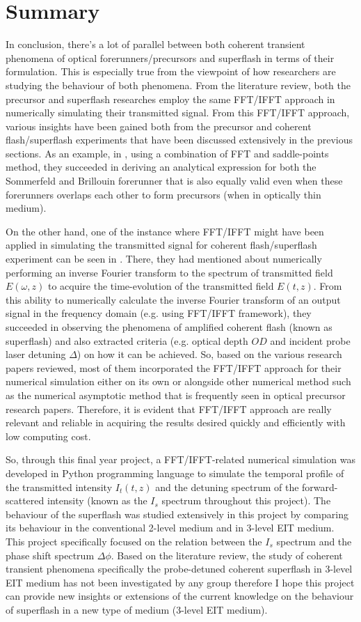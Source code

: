 \chapter{Summary}
In conclusion, there's a lot of parallel between both coherent transient phenomena of optical forerunners/precursors and superflash in terms of their formulation. This is especially true from the viewpoint of how researchers are studying the behaviour of both phenomena. From the literature review, both the precursor and superflash researches employ the same FFT/IFFT approach in numerically simulating their transmitted signal. From this FFT/IFFT approach, various insights have been gained both from the precursor and coherent flash/superflash experiments that have been discussed extensively in the previous sections. As an example, in \cite{Macke2013}, using a combination of FFT and saddle-points method, they succeeded in deriving an analytical expression for both the Sommerfeld and Brillouin forerunner that is also equally valid even when these forerunners overlaps each other to form precursors (when in optically thin medium).

On the other hand, one of the instance where FFT/IFFT might have been applied in simulating the transmitted signal for coherent flash/superflash experiment can be seen in \cite{Kwong2014}. There, they had mentioned about numerically performing an inverse Fourier transform to the spectrum of transmitted field $E(\omega, z)$ to acquire the time-evolution of the transmitted field $E(t, z)$. From this ability to numerically calculate the inverse Fourier transform of an output signal in the frequency domain (e.g. using FFT/IFFT framework), they succeeded in observing the phenomena of amplified coherent flash (known as superflash) and also extracted criteria (e.g. optical depth $OD$ and incident probe laser detuning $\Delta$) on how it can be achieved. So, based on the various research papers reviewed, most of them incorporated the FFT/IFFT approach for their numerical simulation either on its own or alongside other numerical method such as the numerical asymptotic method that is frequently seen in optical precursor research papers. Therefore, it is evident that FFT/IFFT approach are really relevant and reliable in acquiring the results desired quickly and efficiently with low computing cost.

So, through this final year project, a FFT/IFFT-related numerical simulation was developed in Python programming language to simulate the temporal profile of the transmitted intensity $I_{t}(t, z)$ and the detuning spectrum of the forward-scattered intensity (known as the $I_{s}$ spectrum throughout this project). The behaviour of the superflash was studied extensively in this project by comparing its behaviour in the conventional 2-level medium and in 3-level EIT medium. This project specifically focused on the relation between the $I_{s}$ spectrum and the phase shift spectrum $\Delta\phi$. Based on the literature review, the study of coherent transient phenomena specifically the probe-detuned coherent superflash in 3-level EIT medium has not been investigated by any group therefore I hope this project can provide new insights or extensions of the current knowledge on the behaviour of superflash in a new type of medium (3-level EIT medium). 
